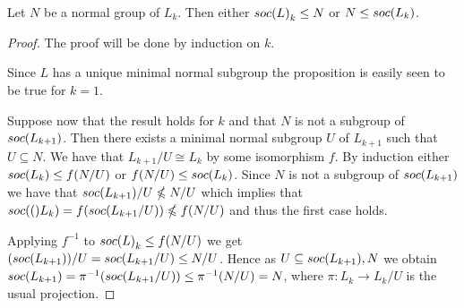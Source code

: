 \begin{theorem}
    \label{th:nsubsoc}
    Let $N$ be a normal group of $L_k$. Then either $soc {(L)}_k \le N$ or $N \le soc {(L_k)}$.
\end{theorem}

\begin{proof}
    The proof will be done by induction on $k$.

    Since $L$ has a unique minimal normal subgroup the proposition is easily seen to be true for $k=1$.
    
    Suppose now that the result holds for $k$ and that $N$ is not a subgroup of $soc {(L_{k+1})}$. Then there exists a minimal normal subgroup $U$ of $L_{k+1}$ such that $U \subseteq N$.
    We have that $L_{k+1}/U \cong L_{k}$ by some isomorphism $f$.
    By induction either $soc {(L_{k})} \le f(N/U)$ or $f(N/U) \le soc {(L_k)}$. Since $N$ is not a subgroup of $soc {(L_{k+1})}$ we have that $soc {(L_{k+1})}/U \nleqslant N/U$ which implies that $soc {(()}L_k) = f(soc {(L_{k+1}/U)}) \nleqslant f(N/U)$ and thus the first case holds.
    
    Applying $f^{-1}$ to $soc {(L)}_{k} \le f(N/U)$ we get $(soc {(L_{k+1})})/U = soc {(L_{k+1}/U)} \le N/U$. Hence as $U \subseteq soc {(L_{k+1})}, N$ we obtain $soc {(L_{k+1})} = \pi^{-1}(soc {(L_{k+1}/U)}) \le \pi^{-1}(N/U) = N$, where $\pi: L_k \rightarrow L_k/U$ is the usual projection.
\end{proof}